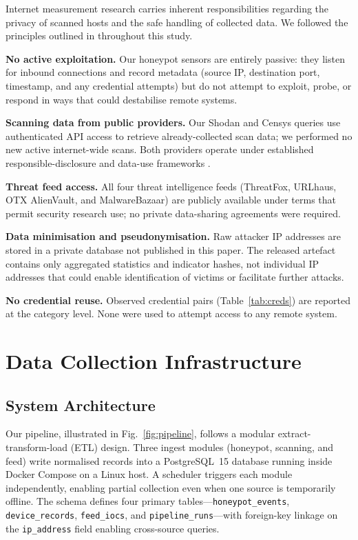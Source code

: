 \documentclass[journal]{IEEEtran}
\begin{document}
Internet measurement research carries inherent responsibilities regarding
the privacy of scanned hosts and the safe handling of collected data.
We followed the principles outlined in \cite{partridge2016ethical} throughout
this study.

\textbf{No active exploitation.}
Our honeypot sensors are entirely passive: they listen for inbound connections
and record metadata (source IP, destination port, timestamp, and any credential
attempts) but do not attempt to exploit, probe, or respond in ways that could
destabilise remote systems.

\textbf{Scanning data from public providers.}
Our Shodan and Censys queries use authenticated API access to retrieve already-collected scan data; we performed no new active internet-wide scans.
Both providers operate under established responsible-disclosure and data-use frameworks \cite{durumeric2015search}.

\textbf{Threat feed access.}
All four threat intelligence feeds (ThreatFox, URLhaus, OTX AlienVault, and
MalwareBazaar) are publicly available under terms that permit security research use; no private data-sharing agreements were required.

\textbf{Data minimisation and pseudonymisation.}
Raw attacker IP addresses are stored in a private database not published in
this paper. The released artefact contains only aggregated statistics and
indicator hashes, not individual IP addresses that could enable identification
of victims or facilitate further attacks.

\textbf{No credential reuse.}
Observed credential pairs (Table~\ref{tab:creds}) are reported at the category
level. None were used to attempt access to any remote system.


\section{Data Collection Infrastructure}
\label{sec:data}

\subsection{System Architecture}

Our pipeline, illustrated in Fig.~\ref{fig:pipeline}, follows a modular
extract-transform-load (ETL) design.
Three ingest modules (honeypot, scanning, and feed) write normalised records
into a PostgreSQL~15 database running inside Docker Compose on a Linux host.
A scheduler triggers each module independently, enabling partial collection
even when one source is temporarily offline.
The schema defines four primary tables---\texttt{honeypot\_events},
\texttt{device\_records}, \texttt{feed\_iocs}, and
\texttt{pipeline\_runs}---with foreign-key linkage on the \texttt{ip\_address}
field enabling cross-source queries.
\end{document}
